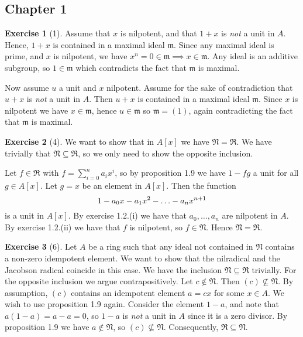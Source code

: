 \documentclass{article}
\theoremstyle{definition}
\newtheorem*{exercise}{Exercise}
\begin{document}
\subsection*{Chapter 1}
\label{sub:chapter_1}



\begin{exercise}[1]
	Assume that $x$ is nilpotent, and that $1 + x$ is \emph{not} a
	unit in $A$. Hence, $1 + x$ is contained in a maximal ideal
	$\mathfrak{m}$. Since any maximal ideal is prime, and $x$ is
	nilpotent, we have $x^n = 0 \in \mathfrak{m} \implies x \in
	\mathfrak{m}$. Any ideal is an additive subgroup, so $1 \in
	\mathfrak{m}$ which contradicts the fact that $\mathfrak{m}$ is
	maximal.

	Now assume $u$ a unit and $x$ nilpotent. Assume for the sake of
	contradiction that $u + x$ is \emph{not} a unit in $A$. Then $u +
	x$ is contained in a maximal ideal $\mathfrak{m}$. Since $x$ is
	nilpotent we have $x \in \mathfrak{m}$, hence $u \in \mathfrak{m}$
	so $\mathfrak{m} = (1)$, again contradicting the fact that
	$\mathfrak{m}$ is maximal.
\end{exercise}

\begin{exercise}[4]
	We want to show that in $A[x]$ we have $\mathfrak{N} =
	\mathfrak{R}$. We have trivially that $\mathfrak{N} \subseteq
	\mathfrak{R}$, so we only need to show the opposite inclusion.

	Let $f \in \mathfrak{R}$ with $f = \sum^{n}_{i=0} a_ix^i$, so by
	proposition 1.9 we have $1 - fg$ a unit for all $g \in A[x]$. Let
	$g = x$ be an element in $A[x]$. Then the function
	\begin{equation}
		\notag
		1 - a_0x - a_1x^2 - \ldots - a_nx^{n+1}
	\end{equation}
	is a unit in $A[x]$. By exercise 1.2.(i) we have that $a_0, \ldots
	,a_n$ are nilpotent in $A$. By exercise 1.2.(ii) we have that $f$
	is nilpotent, so $f \in \mathfrak{N}$. Hence $\mathfrak{N} =
	\mathfrak{R}$.
\end{exercise}

\begin{exercise}[6]
	Let $A$ be a ring such that any ideal not contained in
	$\mathfrak{N}$ contains a non-zero idempotent element. We want to
	show that the nilradical and the Jacobson radical coincide in this
	case. We have the inclusion $\mathfrak{N} \subseteq \mathfrak{R}$
	trivially. For the opposite inclusion we argue contrapositively.
	Let $c \notin \mathfrak{N}$. Then $(c) \not \subseteq
	\mathfrak{N}$. By assumption, $(c)$ contains an idempotent element
	$a = cx$ for some $x \in A$. We wish to use proposition 1.9 again.
	Consider the element $1 - a$, and note that $a(1 - a) = a - a =
	0$, so $1 - a$ is \emph{not} a unit in $A$ since it is a zero
	divisor. By proposition 1.9 we have $a \notin \mathfrak{N}$, so
	$(c) \not \subseteq \mathfrak{N}$. Consequently, $\mathfrak{R}
	\subseteq \mathfrak{N}$.
\end{exercise}
\end{document}
